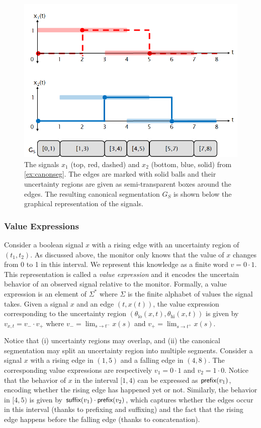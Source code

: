 \begin{figure} 
	\centering
	\includegraphics[scale=0.5]{canonseg.png}
	\caption{The signals $x_1$ (top, red, dashed) and $x_2$ (bottom, blue, solid) from \cref{ex:canonseg}. The edges are marked with solid balls and their uncertainty regions are given as semi-transparent boxes around the edges. The resulting canonical segmentation $G_S$ is shown below the graphical representation of the signals.}
	\label{fig:canonseg}
\end{figure}


\subsubsection{Value Expressions}
Consider a boolean signal $x$ with a rising edge with an uncertainty region of $(t_1, t_2)$.
As discussed above, the monitor only knows that the value of $x$ changes from 0 to 1 in this interval.
We represent this knowledge as a finite word $v = 0 \cdot 1$.
This representation is called a \emph{value expression} and it encodes the uncertain behavior of an observed signal relative to the monitor.
Formally, a value expression is an element of $\Sigma^*$ where $\Sigma$ is the finite alphabet of values the signal takes.
Given a signal $x$ and an edge $(t, x(t))$, the value expression corresponding to the uncertainty region $(\theta_{\text{lo}}(x,t), \theta_{\text{hi}}(x,t))$ is given by $v_{x,t} = v_- \cdot v_+$ where $v_- = \lim_{s \to t^-} x(s)$ and $v_+ = \lim_{s \to t^+} x(s)$.

Notice that (i) uncertainty regions may overlap, and (ii) the canonical segmentation may split an uncertainty region into multiple segments.
Consider a signal $x$ with a rising edge in $(1,5)$ and a falling edge in $(4,8)$.
The corresponding value expressions are respectively $v_1 = 0 \cdot 1$ and $v_2 = 1 \cdot 0$.
Notice that the behavior of $x$ in the interval $[1,4)$ can be expressed as $\textsf{prefix}(v_1)$, encoding whether the rising edge has happened yet or not.
Similarly, the behavior in $[4,5)$ is given by $\textsf{suffix}(v_1) \cdot \textsf{prefix}(v_2)$, which captures whether the edges occur in this interval (thanks to prefixing and suffixing) and the fact that the rising edge happens before the falling edge (thanks to concatenation).

